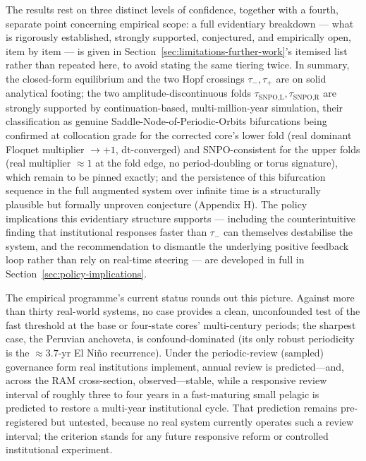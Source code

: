 \documentclass[twocolumn,10pt]{article}
\begin{document}
The results rest on three distinct levels of confidence, together with a fourth, separate point concerning empirical scope: a full evidentiary breakdown --- what is rigorously established, strongly supported, conjectured, and empirically open, item by item --- is given in Section~\ref{sec:limitations-further-work}'s itemised list rather than repeated here, to avoid stating the same tiering twice. In summary, the closed-form equilibrium and the two Hopf crossings $\tau_-,\tau_+$ are on solid analytical footing; the two amplitude-discontinuous folds $\tau_{\text{SNPO,L}},\tau_{\text{SNPO,R}}$ are strongly supported by continuation-based, multi-million-year simulation, their classification as genuine Saddle-Node-of-Periodic-Orbits bifurcations being confirmed at collocation grade for the corrected core's lower fold (real dominant Floquet multiplier $\to+1$, dt-converged) and SNPO-consistent for the upper folds (real multiplier $\approx1$ at the fold edge, no period-doubling or torus signature), which remain to be pinned exactly; and the persistence of this bifurcation sequence in the full augmented system over infinite time is a structurally plausible but formally unproven conjecture (Appendix H). The policy implications this evidentiary structure supports --- including the counterintuitive finding that institutional responses faster than $\tau_-$ can themselves destabilise the system, and the recommendation to dismantle the underlying positive feedback loop rather than rely on real-time steering --- are developed in full in Section~\ref{sec:policy-implications}.

The empirical programme's current status rounds out this picture. Against more than thirty real-world systems, no case provides a clean, unconfounded test of the fast threshold at the base or four-state cores' multi-century periods; the sharpest case, the Peruvian anchoveta, is confound-dominated (its only robust periodicity is the $\approx3.7$-yr El Ni\~no recurrence). Under the periodic-review (sampled) governance form real institutions implement, annual review is predicted---and, across the RAM cross-section, observed---stable, while a responsive review interval of roughly three to four years in a fast-maturing small pelagic is predicted to restore a multi-year institutional cycle. That prediction remains pre-registered but untested, because no real system currently operates such a review interval; the criterion stands for any future responsive reform or controlled institutional experiment.
\end{document}
